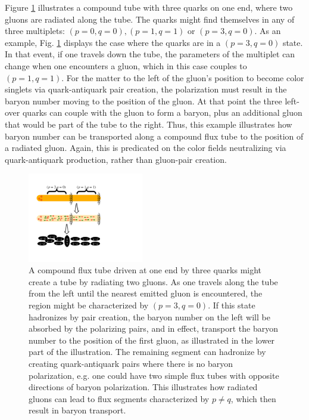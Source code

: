 \documentclass[aps, prc, 12pt, nofootinbib, showpacs, superscriptaddress, tightenlines, groupedaddress]{revtex4-2}
\begin{document}
Figure \ref{fig:gluon_radiation} illustrates a compound tube with three quarks on one end, where two gluons are radiated along the tube. The quarks might find themselves in any of three multiplets: $(p=0,q=0),(p=1,q=1)$ or $(p=3,q=0)$. As an example, Fig. \ref{fig:gluon_radiation} displays the case where the quarks are in a $(p=3,q=0)$ state. In that event, if one travels down the tube, the parameters of the multiplet can change when one encounters a gluon, which in this case couples to $(p=1,q=1)$. For the matter to the left of the gluon's position to become color singlets via quark-antiquark pair creation, the polarization must result in the baryon number moving to the position of the gluon. At that point the three left-over quarks can couple with the gluon to form a baryon, plus an additional gluon that would be part of the tube to the right. Thus, this example illustrates how baryon number can be transported along a compound flux tube to the position of a radiated gluon. Again, this is predicated on the color fields neutralizing via quark-antiquark production, rather than gluon-pair creation.
\begin{figure}
\centerline{\includegraphics[width=0.45\textwidth]{figs/gluon_radiation.pdf}}
\caption{\label{fig:gluon_radiation}
A compound flux tube driven at one end by three quarks might create a tube by radiating two gluons. As one travels along the tube from the left until the nearest emitted gluon is encountered, the region might be characterized by $(p=3,q=0)$. If this state hadronizes by pair creation, the baryon number on the left will be absorbed by the polarizing pairs, and in effect, transport the baryon number to the position of the first gluon, as illustrated in the lower part of the illustration. The remaining segment can hadronize by creating quark-antiquark pairs where there is no baryon polarization, e.g. one could have two simple flux tubes with opposite directions of baryon polarization. This illustrates how radiated gluons can lead to flux segments characterized by $p\ne q$, which then result in baryon transport.
}
\end{figure}
\end{document}

